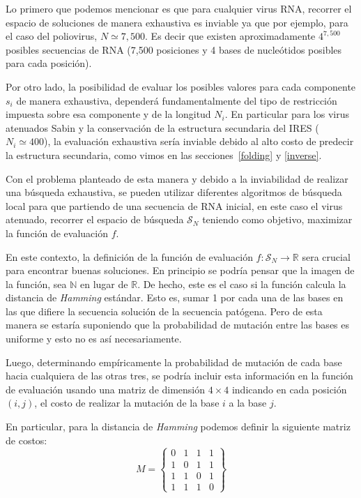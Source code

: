 Lo primero que podemos mencionar es que para cualquier virus \ac{RNA}, recorrer
el espacio de soluciones de manera exhaustiva es inviable ya que por ejemplo,
para el caso del poliovirus, $N \simeq 7,500$. Es decir que existen
aproximadamente $4^{7,500}$ posibles secuencias de \ac{RNA} (7,500
posiciones y 4 bases de nucle\'otidos posibles para cada posici\'on).

Por otro lado, la posibilidad de evaluar los posibles valores para cada
componente $s_{i}$ de manera exhaustiva, depender\'a fundamentalmente del tipo
de restricci\'on impuesta sobre esa componente y de la longitud $N_{i}$. En
particular para los virus atenuados Sabin y la conservaci\'on de la estructura
secundaria del \ac{IRES} ($N_{i} \simeq 400$), la evaluaci\'on exhaustiva
ser\'ia inviable debido al alto costo de predecir la estructura secundaria,
como vimos en las secciones~\ref{folding} y \ref{inverse}.

Con el problema planteado de esta manera y debido a la inviabilidad de realizar
una b\'usqueda exhaustiva, se pueden utilizar diferentes algoritmos de
b\'usqueda local para que partiendo de una secuencia de \ac{RNA} inicial, en
este caso el virus atenuado, recorrer el espacio de b\'usqueda $\mathcal{S}_{N}$
teniendo como objetivo, maximizar la funci\'on de evaluaci\'on $f$.

En este contexto, la definici\'on de la funci\'on de evaluaci\'on $f:
\mathcal{S}_{N} \rightarrow \mathbb{R}$ sera crucial para encontrar buenas
soluciones. En principio se podr\'ia pensar que la imagen de la funci\'on, sea
$\mathbb{N}$ en lugar de $\mathbb{R}$. De hecho, este es el caso si la funci\'on
calcula la distancia de \textit{Hamming} est\'andar. Esto es, sumar 1 por cada
una de las bases en las que difiere la secuencia soluci\'on de la secuencia
pat\'ogena. Pero de esta manera se estar\'ia suponiendo que la probabilidad de
mutaci\'on entre las bases es uniforme y esto no es as\'i necesariamente. 

Luego, determinando emp\'iricamente la probabilidad de mutaci\'on de cada base
hacia cualquiera de las otras tres, se podr\'ia incluir esta informaci\'on en la
funci\'on de evaluaci\'on usando una matriz de dimensi\'on $4\times4$ indicando
en cada posici\'on $(i,j)$, el costo de realizar la mutaci\'on de la base $i$ a
la base $j$.

En particular, para la distancia de \textit{Hamming} podemos definir la
siguiente matriz de costos:
\[
M = 
\begin{Bmatrix}
 0 & 1 & 1 & 1\\
 1 & 0 & 1 & 1\\
 1 & 1 & 0 & 1\\
 1 & 1 & 1 & 0
\end{Bmatrix}
\]

